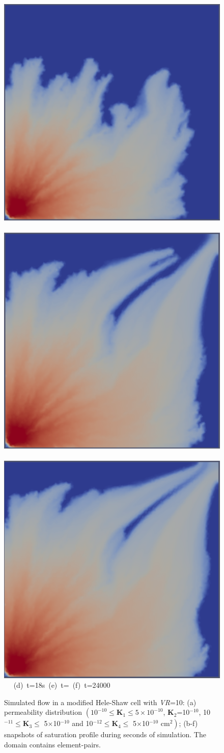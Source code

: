 \begin{landscape}
\begin{figure}[ht]
{      \vspace{0.5cm}
      \hbox{\includegraphics[width=.5\textwidth]{./Pics1/Saffman_heterogeneous/saffman_heter_fixed_3000.pdf}
            \includegraphics[width=.5\textwidth]{./Pics1/Saffman_heterogeneous/saffman_heter_fixed_6000.pdf}
            \includegraphics[width=.5\textwidth]{./Pics1/Saffman_heterogeneous/saffman_heter_fixed_24000.pdf} }
      \hbox{\hspace{2.5cm} (d) t=18s \hspace{5.cm} (e) t= \hspace{3.0cm} (f) t=24000 }}
\caption{Simulated flow in a modified Hele-Shaw cell with {\it VR}=10: (a) permeability distribution $\left(\text{10}^{-10}\le\mathbf{K}_{1}\le\text{5}\times\text{10}^{-10}\right.$, {\bf K}$_{2}$=10$^{-10}$, 10$^{-11}\le\mathbf{K}_{3}\le$ 5$\times$10$^{-10}$ and 10$^{-12}\le\mathbf{K}_{4}\le$ 5$\times$10$\left.^{-10}\text{ cm}^{2}\right)$; (b-f) snapshots of saturation profile during  seconds of simulation. The domain contains   element-pairs.}
\label{fig:HeleShawHeter_VR10}
\end{figure}
\end{landscape}
\clearpage



